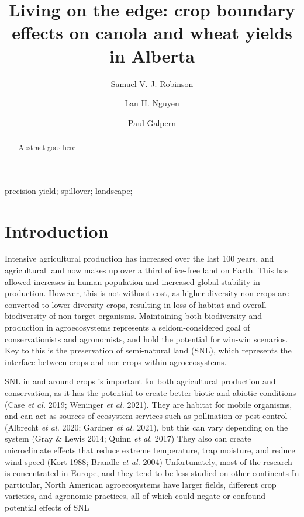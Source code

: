 \documentclass[]{elsarticle} %
\begin{document}
\begin{frontmatter}

  \title{Living on the edge: crop boundary effects on canola and wheat yields in Alberta}
    \author[University of Calgary]{Samuel V. J. Robinson}
    \author[University of Calgary]{Lan H. Nguyen}
    \author[University of Calgary]{Paul Galpern}
      \address[University of Calgary]{2500 University Drive NW, Calgary, AB}
  
  \begin{abstract}
  Abstract goes here
  \end{abstract}
   \begin{keyword} precision yield; spillover; landscape;\end{keyword}
 \end{frontmatter}

\newpage
\doublespacing

\hypertarget{introduction}{%
\section{Introduction}\label{introduction}}

Intensive agricultural production has increased over the last 100 years, and agricultural land now makes up over a third of ice-free land on Earth.
This has allowed increases in human population and increased global stability in production.
However, this is not without cost, as higher-diversity non-crops are converted to lower-diversity crops, resulting in loss of habitat and overall biodiversity of non-target organisms.
Maintaining both biodiversity and production in agroecosystems represents a seldom-considered goal of conservationists and agronomists, and hold the potential for win-win scenarios.
Key to this is the preservation of semi-natural land (SNL), which represents the interface between crops and non-crops within agroecosystems.

SNL in and around crops is important for both agricultural production and conservation, as it has the potential to create better biotic and abiotic conditions (Case \emph{et al.} 2019; Weninger \emph{et al.} 2021).
They are habitat for mobile organisms, and can act as sources of ecosystem services such as pollination or pest control (Albrecht \emph{et al.} 2020; Gardner \emph{et al.} 2021), but this can vary depending on the system (Gray \& Lewis 2014; Quinn \emph{et al.} 2017)
They also can create microclimate effects that reduce extreme temperature, trap moisture, and reduce wind speed (Kort 1988; Brandle \emph{et al.} 2004)
Unfortunately, most of the research is concentrated in Europe, and they tend to be less-studied on other continents
In particular, North American agroecosystems have larger fields, different crop varieties, and agronomic practices, all of which could negate or confound potential effects of SNL
\end{document}
